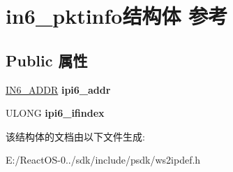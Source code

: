 \hypertarget{structin6__pktinfo}{}\section{in6\+\_\+pktinfo结构体 参考}
\label{structin6__pktinfo}
\subsection*{Public 属性}
\begin{DoxyCompactItemize}
\item 
\mbox{\label{structin6__pktinfo_a6c58ccface1c2f151591e8381babb415}} 
\hyperlink{structin6__addr}{I\+N6\+\_\+\+A\+D\+DR} {\bfseries ipi6\+\_\+addr}
\item 
\mbox{\label{structin6__pktinfo_aa19e8f886454c3afe366599079855f73}} 
U\+L\+O\+NG {\bfseries ipi6\+\_\+ifindex}
\end{DoxyCompactItemize}


该结构体的文档由以下文件生成\+:\begin{DoxyCompactItemize}
\item 
E\+:/\+React\+O\+S-\/0../sdk/include/psdk/ws2ipdef.\+h\end{DoxyCompactItemize}
